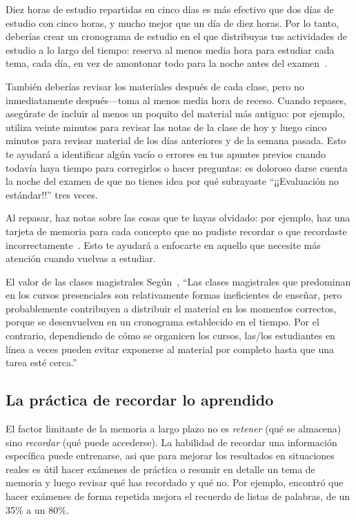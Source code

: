 Diez horas de estudio repartidas en cinco días
es más efectivo que dos días de estudio con cinco horas,
y mucho mejor que un día de diez horas.
Por lo tanto, deberías crear un cronograma de estudio en el que distribuyas tus actividades de estudio a lo largo del tiempo:
reserva al menos media hora para estudiar cada tema, cada día,
en vez de amontonar todo para la noche antes del examen~\cite{Kang2016}.

También deberías revisar los materiales después de cada clase,
pero no inmediatamente después---toma al menos media hora de receso.
Cuando repases,
asegúrate de incluir al menos un poquito del material más antiguo:
por ejemplo,
utiliza veinte minutos para revisar las notas de la clase de hoy
y luego cinco minutos para revisar material de los días anteriores
y de la semana pasada.
Esto te ayudará a identificar algún vacío o errores en tus apuntes previos
cuando todavía haya tiempo para corregirlos o hacer preguntas:
es doloroso darse cuenta la noche del examen
de que no tienes idea por qué subrayaste ``¡¡Evaluación no estándar!!'' tres veces.

Al repasar,
haz notas sobre las cosas que te hayas olvidado:
por ejemplo,
haz una tarjeta de memoria para cada concepto que no pudiste recordar
o que recordaste incorrectamente~\cite{Matt2019}.
Esto te ayudará a enfocarte en aquello que necesite más atención cuando vuelvas a estudiar.

\begin{aside}{El valor de las clases magistrales}
  Según~\cite{Mill2016a},
  ``Las clases magistrales que predominan en los cursos presenciales son relativamente formas ineficientes de enseñar,
  pero probablemente contribuyen a distribuir el material en los momentos correctos,
  porque se desenvuelven en un cronograma establecido en el tiempo.
  Por el contrario,
  dependiendo de cómo se organicen los cursos,
  las/los estudiantes en línea a veces pueden evitar exponerse al material por completo hasta que una tarea esté cerca.''
\end{aside}

\subsection*{La práctica de recordar lo aprendido}

El factor limitante de la memoria a largo plazo no es \emph{retener} (qué se almacena)
sino \emph{recordar} (qué puede accederse).
La habilidad de recordar una información específica puede entrenarse,
asi que para mejorar los resultados en situaciones reales
es útil hacer exámenes de práctica o resumir en detalle un tema de memoria
y luego revisar qué has recordado y qué no.
Por ejemplo,
\cite{Karp2008} encontró que hacer exámenes de forma repetida mejora el recuerdo de listas de palabras, de un 35\% a un 80\%.

